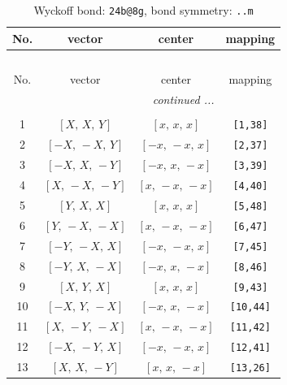 \documentclass[fleqn,8pt]{jsarticle}
\begin{document}
\begin{longtable}{cccc}
\caption{Wyckoff bond: {\tt 24b@8g}, bond symmetry: {\tt ..m}}
 \\
 \hline \hline
No. & vector & center & mapping \\ \hline \endfirsthead

\multicolumn{3}{l}{\tablename\ \thetable{}} \\
 \hline \hline
No. & vector & center & mapping \\ \hline \endhead

 \hline \hline
\multicolumn{3}{r}{\footnotesize\it continued ...} \\ \endfoot

 \hline \hline
\multicolumn{3}{r}{} \\ \endlastfoot

1 & $\left[ X,\, X,\, Y \right]$ & $\left[ x,\, x,\, x \right]$ & {\tt [1,38]} \\ \hline
2 & $\left[ - X,\, - X,\, Y \right]$ & $\left[ - x,\, - x,\, x \right]$ & {\tt [2,37]} \\ \hline
3 & $\left[ - X,\, X,\, - Y \right]$ & $\left[ - x,\, x,\, - x \right]$ & {\tt [3,39]} \\ \hline
4 & $\left[ X,\, - X,\, - Y \right]$ & $\left[ x,\, - x,\, - x \right]$ & {\tt [4,40]} \\ \hline
5 & $\left[ Y,\, X,\, X \right]$ & $\left[ x,\, x,\, x \right]$ & {\tt [5,48]} \\ \hline
6 & $\left[ Y,\, - X,\, - X \right]$ & $\left[ x,\, - x,\, - x \right]$ & {\tt [6,47]} \\ \hline
7 & $\left[ - Y,\, - X,\, X \right]$ & $\left[ - x,\, - x,\, x \right]$ & {\tt [7,45]} \\ \hline
8 & $\left[ - Y,\, X,\, - X \right]$ & $\left[ - x,\, x,\, - x \right]$ & {\tt [8,46]} \\ \hline
9 & $\left[ X,\, Y,\, X \right]$ & $\left[ x,\, x,\, x \right]$ & {\tt [9,43]} \\ \hline
10 & $\left[ - X,\, Y,\, - X \right]$ & $\left[ - x,\, x,\, - x \right]$ & {\tt [10,44]} \\ \hline
11 & $\left[ X,\, - Y,\, - X \right]$ & $\left[ x,\, - x,\, - x \right]$ & {\tt [11,42]} \\ \hline
12 & $\left[ - X,\, - Y,\, X \right]$ & $\left[ - x,\, - x,\, x \right]$ & {\tt [12,41]} \\ \hline
13 & $\left[ X,\, X,\, - Y \right]$ & $\left[ x,\, x,\, - x \right]$ & {\tt [13,26]} \\ \hline

\end{longtable}
\end{document}
